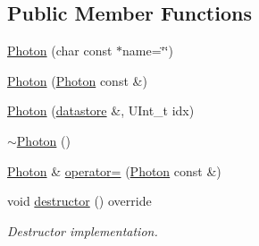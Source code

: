 \subsection*{Public Member Functions}
\begin{DoxyCompactItemize}
\item 
\hyperlink{classpanda_1_1Photon_a4a65a603af7ae878ce7a47f37aa61ae1}{Photon} (char const $\ast$name=\char`\"{}\char`\"{})
\item 
\hyperlink{classpanda_1_1Photon_a24cd4cce4540ae2b4fe271e870e098ee}{Photon} (\hyperlink{classpanda_1_1Photon}{Photon} const \&)
\item 
\hyperlink{classpanda_1_1Photon_a7ad114af287803e52d9d82e2d71a36db}{Photon} (\hyperlink{structpanda_1_1Element_1_1datastore}{datastore} \&, UInt\_\-t idx)
\item 
\hyperlink{classpanda_1_1Photon_abe98765774ca8c543ed105e5e2592a31}{$\sim$Photon} ()
\item 
\hyperlink{classpanda_1_1Photon}{Photon} \& \hyperlink{classpanda_1_1Photon_aa747baa897eca18a06d897063402a966}{operator=} (\hyperlink{classpanda_1_1Photon}{Photon} const \&)
\item 
void \hyperlink{classpanda_1_1Photon_a03611f9014bd137d9aa651ac938575c7}{destructor} () override
\begin{DoxyCompactList}\small\item\em Destructor implementation. \item\end{DoxyCompactList}\end{DoxyCompactItemize}
